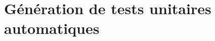 \chapter{Génération de tests unitaires automatiques}
\label{chapter:generation-de-tests-unitaires-automatiques}
